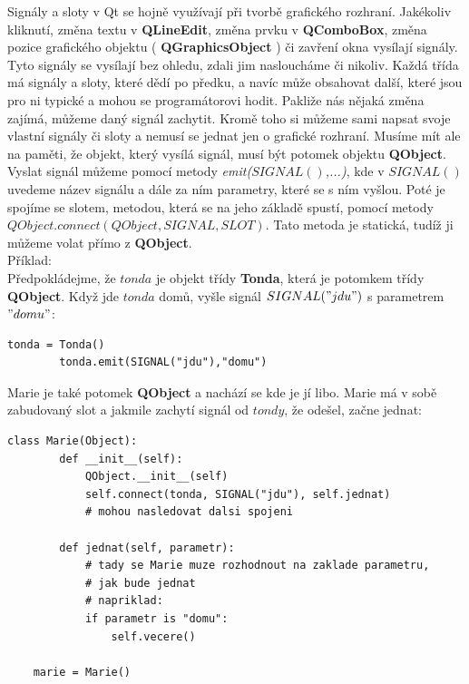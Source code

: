 Signály a sloty v Qt se hojně využívají při tvorbě grafického rozhraní. Jakékoliv kliknutí, změna textu v \textbf{QLineEdit}, změna prvku v \textbf{QComboBox}, změna pozice grafického objektu ( \textbf{QGraphicsObject} ) či zavření okna vysílají signály. Tyto signály se vysílají bez ohledu, zdali jim nasloucháme či nikoliv. Každá třída má signály a sloty, které dědí po předku, a navíc může obsahovat další, které jsou pro ni typické a mohou se programátorovi hodit. Pakliže nás nějaká změna zajímá, můžeme daný signál zachytit. Kromě toho si můžeme sami napsat svoje vlastní signály či sloty a nemusí se jednat jen o grafické rozhraní. Musíme mít ale na paměti, že objekt, který vysílá signál, musí být potomek objektu \textbf{QObject}. Vyslat signál můžeme  pomocí metody \textit{emit($SIGNAL()$,...)}, kde v $SIGNAL()$ uvedeme název signálu a dále za ním parametry, které se s ním vyšlou. Poté je spojíme se slotem, metodou, která se na jeho základě spustí, pomocí metody $QObject.connect(QObject, SIGNAL, SLOT)$. Tato metoda je statická, tudíž ji můžeme volat přímo z \textbf{QObject}. \\

\noindent Příklad: \\

Předpokládejme, že $tonda$ je objekt třídy \textbf{Tonda}, která je potomkem třídy \textbf{QObject}. Když jde $tonda$ domů, vyšle signál $SIGNAL("jdu")$ s parametrem $"domu"$: \\


\begin{lstlisting}[label=qtemit,caption={vyslání slotu pod názvem $"jdu"$ s atributem $"domu"$}]
		tonda = Tonda()
		tonda.emit(SIGNAL("jdu"),"domu")
\end{lstlisting}

Marie je také potomek \textbf{QObject} a nachází se kde je jí libo. Marie má v sobě zabudovaný slot a jakmile zachytí signál od $tondy$, že odešel, začne jednat: \\


\begin{lstlisting}[label=qtconnect,caption={zachycení signálu $"odesel"$ od tondy}, morekeywords={Marie, SIGNAL, QObject}]
	class Marie(Object):
		def __init__(self):
			QObject.__init__(self)
			self.connect(tonda, SIGNAL("jdu"), self.jednat)
			# mohou nasledovat dalsi spojeni
		
		def jednat(self, parametr):
			# tady se Marie muze rozhodnout na zaklade parametru, 
			# jak bude jednat
			# napriklad:
			if parametr is "domu":
				self.vecere()
		
	marie = Marie()
\end{lstlisting}

